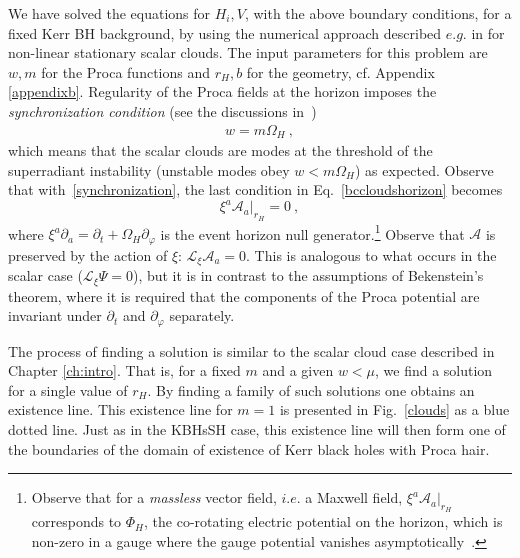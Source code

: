 We have solved the equations for $H_i,V$, with the above boundary  conditions, for
a fixed Kerr BH background, by using the numerical approach described $e.g.$ in \cite{Herdeiro:2014pka}
for non-linear stationary scalar clouds.
The input parameters for this problem are $w,m$ for the Proca functions and $r_H,b$ for the geometry, cf. Appendix \ref{appendixb}.
Regularity of the Proca fields at the horizon imposes the \textit{synchronization condition} (see the discussions in~\cite{Benone:2014ssa,Brihaye:2014nba})
 \begin{eqnarray}
w=m\Omega_H~,
\label{synchronization} 
\end{eqnarray}
which means that the scalar clouds are modes at the threshold of the superradiant instability (unstable modes obey $w<m\Omega_H$) as expected.
Observe that with~\eqref{synchronization}, the last condition in Eq.~\eqref{bccloudshorizon} becomes
\begin{equation}
\label{condA}
\xi^a \mathcal{A}_a\big|_{r_H}=0 \ ,
\end{equation}
%
where $\xi^a\partial_a=\partial_t+\Omega_H\partial_\varphi$ is the event horizon null generator.\footnote{Observe that for a \textit{massless} vector field, $i.e.$ a Maxwell field, $\xi^a \mathcal{A}_a\big|_{r_H}$ corresponds 
to $\Phi_H$, the co-rotating electric potential on the horizon, which is non-zero in a gauge where the gauge potential vanishes asymptotically~\cite{Townsend:1997ku}.}
Observe that  $\mathcal{A}$ is preserved by the action of $\xi$: $\mathcal{L}_\xi\mathcal{A}_a=0$. 
This is analogous to what occurs in the scalar case ($\mathcal{L}_\xi\Psi=0$), but it is in contrast to the assumptions of Bekenstein's theorem, where it is required that the components of the Proca potential are invariant under $\partial_t$ and $\partial_\varphi$ separately.

The process of finding a solution is similar to the scalar cloud case described in Chapter \ref{ch:intro}.
That is, for a fixed $m$ and a given $w<\mu$, we find a solution for a single value of $r_H$.
By finding a family of such solutions one obtains an existence line.
This existence line for $m=1$ is presented in Fig.~\ref{clouds} as a blue dotted line.
Just as in the KBHsSH case, this existence line will then form one of the boundaries of the domain of existence of Kerr black holes with Proca hair.

